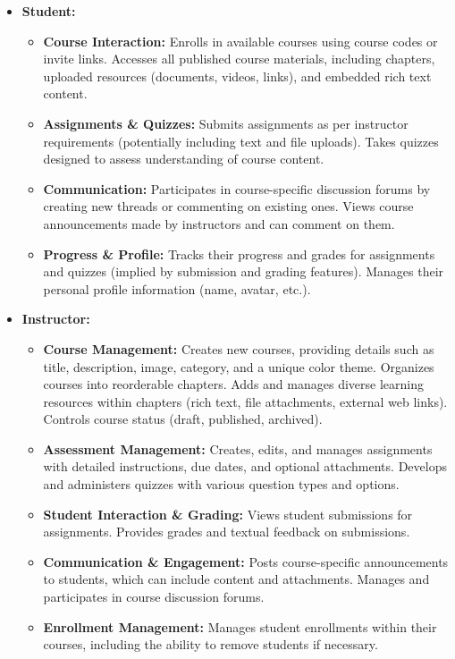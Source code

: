 \documentclass[12pt,a4paper]{article}
\begin{document}
\begin{itemize}
    \item \textbf{Student:}
    \begin{itemize}
        \item \textbf{Course Interaction:} Enrolls in available courses using course codes or invite links. Accesses all published course materials, including chapters, uploaded resources (documents, videos, links), and embedded rich text content.
        \item \textbf{Assignments \& Quizzes:} Submits assignments as per instructor requirements (potentially including text and file uploads). Takes quizzes designed to assess understanding of course content.
        \item \textbf{Communication:} Participates in course-specific discussion forums by creating new threads or commenting on existing ones. Views course announcements made by instructors and can comment on them.
        \item \textbf{Progress & Profile:} Tracks their progress and grades for assignments and quizzes (implied by submission and grading features). Manages their personal profile information (name, avatar, etc.).
    \end{itemize}
    \item \textbf{Instructor:}
    \begin{itemize}
        \item \textbf{Course Management:} Creates new courses, providing details such as title, description, image, category, and a unique color theme. Organizes courses into reorderable chapters. Adds and manages diverse learning resources within chapters (rich text, file attachments, external web links). Controls course status (draft, published, archived).
        \item \textbf{Assessment Management:} Creates, edits, and manages assignments with detailed instructions, due dates, and optional attachments. Develops and administers quizzes with various question types and options.
        \item \textbf{Student Interaction \& Grading:} Views student submissions for assignments. Provides grades and textual feedback on submissions.
        \item \textbf{Communication \& Engagement:} Posts course-specific announcements to students, which can include content and attachments. Manages and participates in course discussion forums.
        \item \textbf{Enrollment Management:} Manages student enrollments within their courses, including the ability to remove students if necessary.

\end{itemize}
\end{itemize}
\end{document}
